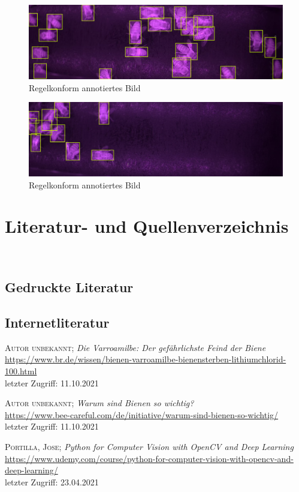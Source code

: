 \documentclass[11pt,a4paper]{article}
\newcommand{\bibLabel}[1]{\label{#1}\hypertarget{#1}{}}
\begin{document}
\begin{figure}[!htb] \label{annotated2}
    \centering
	    \includegraphics[width = .8\textwidth]{images/annotated2.png}
        \caption{Regelkonform annotiertes Bild}
\end{figure}

\begin{figure}[!htb] \label{annotated3}
    \centering
	    \includegraphics[width = .8\textwidth]{images/annotated3.png}
        \caption{Regelkonform annotiertes Bild}
\end{figure}
\newpage
\section{Literatur- und Quellenverzeichnis}
\begin{thebibliography}
\\
\subsection{Gedruckte Literatur}

\subsection{Internetliteratur}
\setcounter{enumiv}{0}

\label{i1}
	\textsc{Autor unbekannt};
	\textit{Die Varroamilbe: Der gefährlichste Feind der Biene}\\
	\url{https://www.br.de/wissen/bienen-varroamilbe-bienensterben-lithiumchlorid-100.html}\\
	letzter Zugriff: 11.10.2021

\label{i2}
	\textsc{Autor unbekannt};
	\textit{Warum sind Bienen so wichtig?}\\
	\url{https://www.bee-careful.com/de/initiative/warum-sind-bienen-so-wichtig/}\\
	letzter Zugriff: 11.10.2021

 \bibLabel{udemy}
	\textsc{Portilla, Jose};
	\textit{Python for Computer Vision with OpenCV and Deep Learning}\\
	\url{https://www.udemy.com/course/python-for-computer-vision-with-opencv-and-deep-learning/}\\
	letzter Zugriff: 23.04.2021

\end{thebibliography}
\end{document}
